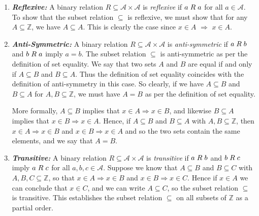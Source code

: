 \documentclass[a4paper,12pt]{article}
\begin{document}
\begin{enumerate}
\item \textit{\textbf{Reflexive:}} A binary relation $R \subseteq \mathcal{A} \times \mathcal{A}$ is \textit{reflexive} if $a \hspace{1mm} R \hspace{1mm} a$ for all $a \in \mathcal{A}$. To show that the subset relation $\subseteq$ is reflexive, we must show that for any $A \subseteq \mathbb{Z}$, we have $A \subseteq A$. This is clearly the case since $x \in A$ $\Rightarrow$ $x \in A$.

\item \textit{\textbf{Anti-Symmetric:}} A binary relation $R \subseteq \mathcal{A} \times \mathcal{A}$ is \textit{anti-symmetric} if $a \hspace{1mm} R \hspace{1mm} b$ and $b \hspace{1mm} R \hspace{1mm} a$ imply $a=b$. The subset relation $\subseteq$ is anti-symmetric as per the definition of set equality. We say that two sets $A$ and $B$ are equal if and only if $A \subseteq B$ and $B \subseteq A$. Thus the definition of set equality coincides with the definition of anti-symmetry in this case. So clearly, if we have $A \subseteq B$ and $B \subseteq A$ for $A, B \subseteq \mathbb{Z}$, we must have $A = B$ as per the definition of set equality. 

More formally, $A \subseteq B$ implies that $x \in A \Rightarrow x \in B$, and likewise $B \subseteq A$ implies that $x \in B \Rightarrow x \in A$. Hence, if $A \subseteq B$ and $B \subseteq A$ with $A, B \subseteq \mathbb{Z}$, then $x \in A \Rightarrow x \in B$ and $x \in B \Rightarrow x \in A$ and so the two sets contain the same elements, and we say that $A = B$. 

\item \textit{\textbf{Transitive:}} A binary relation $R \subseteq \mathcal{A} \times \mathcal{A}$ is \textit{transitive} if $a \hspace{1mm} R \hspace{1mm} b$ and $b \hspace{1mm} R \hspace{1mm} c$ imply $a \hspace{1mm} R \hspace{1mm} c$ for all $a, b, c \in \mathcal{A}$. Suppose we know that $A \subseteq B$ and $B \subseteq C$ with $A, B, C \subseteq \mathbb{Z}$, so that $x \in A \Rightarrow x \in B$ and $x \in B \Rightarrow x \in C$. Hence if $x \in A$ we can conclude that $x \in C$, and we can write $A \subseteq C$, so the subset relation $\subseteq$ is transitive. This establishes the subset relation $\subseteq$ on all subsets of $\mathbb{Z}$ as a partial order. 
\end{enumerate}
\end{document}
